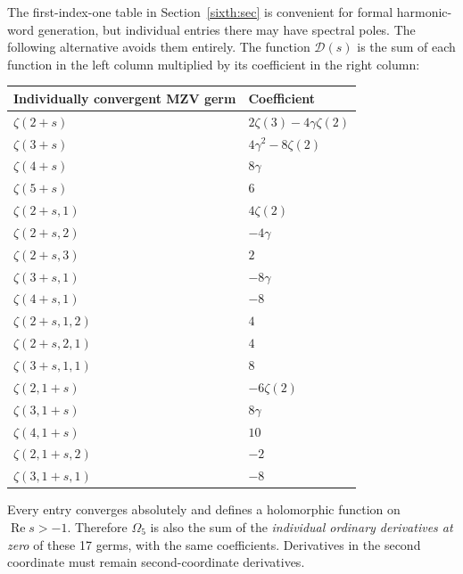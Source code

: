 \documentclass[11pt,a4paper]{article}
\numberwithin{equation}{section}
\theoremstyle{definition}
\theoremstyle{remark}
\newcommand{\re}{\operatorname{Re}}
\begin{document}
The first-index-one table in Section~\ref{sixth:sec} is convenient for
formal harmonic-word generation, but individual entries there may
have spectral poles.  The following alternative avoids them entirely.
The function $\mathcal D(s)$ is the sum of each function in the left
column multiplied by its coefficient in the right column:
\begin{center}
\begin{tabular}{@{}ll@{}}
\toprule
Individually convergent MZV germ & Coefficient \\
\midrule
$\zeta(2+s)$ & $2\zeta(3)-4\gamma\zeta(2)$\\
$\zeta(3+s)$ & $4\gamma^2-8\zeta(2)$\\
$\zeta(4+s)$ & $8\gamma$\\
$\zeta(5+s)$ & $6$\\
$\zeta(2+s,1)$ & $4\zeta(2)$\\
$\zeta(2+s,2)$ & $-4\gamma$\\
$\zeta(2+s,3)$ & $2$\\
$\zeta(3+s,1)$ & $-8\gamma$\\
$\zeta(4+s,1)$ & $-8$\\
$\zeta(2+s,1,2)$ & $4$\\
$\zeta(2+s,2,1)$ & $4$\\
$\zeta(3+s,1,1)$ & $8$\\
$\zeta(2,1+s)$ & $-6\zeta(2)$\\
$\zeta(3,1+s)$ & $8\gamma$\\
$\zeta(4,1+s)$ & $10$\\
$\zeta(2,1+s,2)$ & $-2$\\
$\zeta(3,1+s,1)$ & $-8$\\
\bottomrule
\end{tabular}
\end{center}
Every entry converges absolutely and defines a holomorphic function
on $\re s>-1$.  Therefore $\Omega_5$ is also the sum of the
\emph{individual ordinary derivatives at zero} of these 17 germs,
with the same coefficients.  Derivatives in the second coordinate
must remain second-coordinate derivatives.
\end{document}
